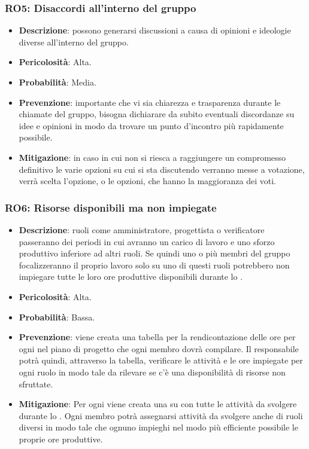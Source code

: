 \subsubsection{RO5: Disaccordi all'interno del gruppo}
\begin{itemize}
    \item \textbf{Descrizione}: possono generarsi discussioni a causa di opinioni e ideologie diverse all'interno del gruppo.
    \item \textbf{Pericolosità}: Alta.
    \item \textbf{Probabilità}: Media.
    \item \textbf{Prevenzione}: importante che vi sia chiarezza e trasparenza durante le chiamate del gruppo, bisogna dichiarare da subito eventuali discordanze su idee e opinioni in modo da trovare un punto d'incontro più rapidamente possibile.
    \item \textbf{Mitigazione}: in caso in cui non si riesca a raggiungere un compromesso definitivo le varie opzioni su cui si sta discutendo verranno messe a votazione, verrà scelta l'opzione, o le opzioni, che hanno la maggioranza dei voti. 
\end{itemize}

\subsubsection{RO6: Risorse disponibili ma non impiegate}
\begin{itemize}
    \item \textbf{Descrizione}: ruoli come amministratore, progettista o verificatore passeranno dei periodi in cui avranno un carico di lavoro e uno sforzo produttivo inferiore ad altri ruoli. 
    Se quindi uno o più membri del gruppo focalizzeranno il proprio lavoro solo su uno di questi ruoli potrebbero non impiegare tutte le loro ore produttive disponibili durante lo .
    \item \textbf{Pericolosità}: Alta.
    \item \textbf{Probabilità}: Bassa.
    \item \textbf{Prevenzione}: viene creata una tabella per la rendicontazione delle ore per ogni  nel piano di progetto che ogni membro dovrà compilare.
    Il responsabile potrà quindi, attraverso la tabella, verificare le attività e le ore impiegate per ogni ruolo in modo tale da rilevare se c'è una disponibilità di risorse non sfruttate.
    \item \textbf{Mitigazione}:  Per ogni  viene creata una  su  con tutte le attività da svolgere durante lo .
    Ogni membro potrà assegnarsi attività da svolgere anche di ruoli diversi in modo tale che ognuno impieghi nel modo più efficiente possibile le proprie ore produttive.
\end{itemize}
